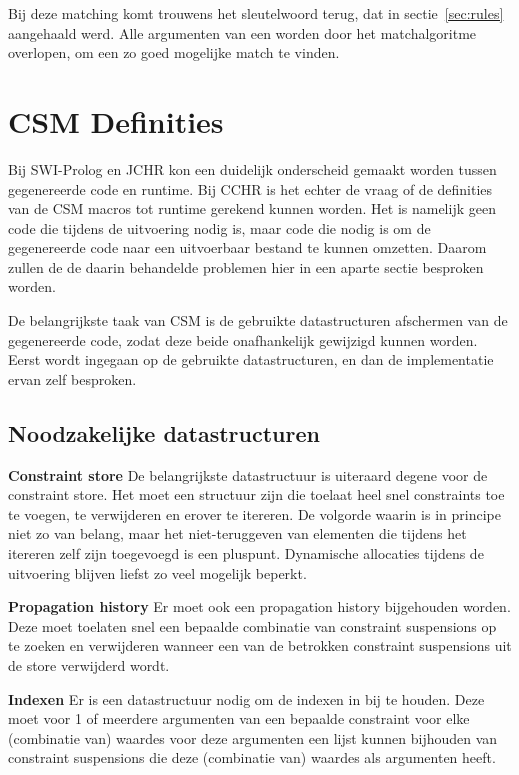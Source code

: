 Bij deze matching komt trouwens het sleutelwoord  terug, dat in sectie~\ref{sec:rules} aangehaald werd. Alle argumenten van een  worden door het matchalgoritme overlopen, om een zo goed mogelijke match te vinden.

\section{CSM Definities} \label{sec:csmdef}

Bij SWI-Prolog en JCHR kon een duidelijk onderscheid gemaakt worden tussen gegenereerde code en runtime. Bij CCHR is het echter de vraag of de definities van de CSM macros tot runtime gerekend kunnen worden. Het is namelijk geen code die tijdens de uitvoering nodig is, maar code die nodig is om de gegenereerde code naar een uitvoerbaar bestand te kunnen omzetten. Daarom zullen de de daarin behandelde problemen hier in een aparte sectie besproken worden.

De belangrijkste taak van CSM is de gebruikte datastructuren afschermen van de gegenereerde code, zodat deze beide onafhankelijk gewijzigd kunnen worden. Eerst wordt ingegaan op de gebruikte datastructuren, en dan de implementatie ervan zelf besproken.

\subsection{Noodzakelijke datastructuren} \label{sec:datastruct}

{\bf Constraint store} De belangrijkste datastructuur is uiteraard degene voor de constraint store. Het moet een structuur zijn die toelaat heel snel constraints toe te voegen, te verwijderen en erover te itereren. De volgorde waarin is in principe niet zo van belang, maar het niet-teruggeven van elementen die tijdens het itereren zelf zijn toegevoegd is een pluspunt. Dynamische allocaties tijdens de uitvoering blijven liefst zo veel mogelijk beperkt.

{\bf Propagation history} Er moet ook een propagation history bijgehouden worden. Deze moet toelaten snel een bepaalde combinatie van constraint suspensions op te zoeken en verwijderen wanneer een van de betrokken constraint suspensions uit de store verwijderd wordt.

{\bf Indexen} Er is een datastructuur nodig om de indexen in bij te houden. Deze moet voor 1 of meerdere argumenten van een bepaalde constraint voor elke (combinatie van) waardes voor deze argumenten een lijst kunnen bijhouden van constraint suspensions die deze (combinatie van) waardes als argumenten heeft.
 
